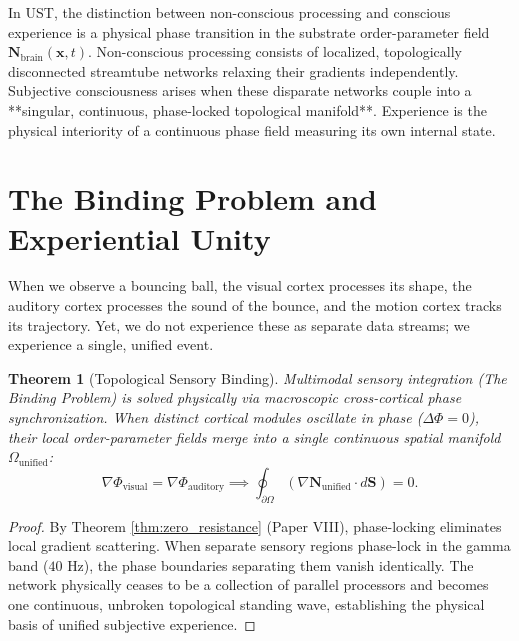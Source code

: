 \documentclass[11pt,a4paper]{article}
\newtheorem{thm}{Theorem}
\begin{document}
	In UST, the distinction between non-conscious processing and conscious experience is a physical phase transition in the substrate order-parameter field $\mathbf{N}_{\text{brain}}(\mathbf{x}, t)$. 
	Non-conscious processing consists of localized, topologically disconnected streamtube networks relaxing their gradients independently. Subjective consciousness arises when these disparate networks couple into a **singular, continuous, phase-locked topological manifold**. Experience is the physical interiority of a continuous phase field measuring its own internal state.
	
	\section{The Binding Problem and Experiential Unity}
	\label{sec:binding_problem}
	
	When we observe a bouncing ball, the visual cortex processes its shape, the auditory cortex processes the sound of the bounce, and the motion cortex tracks its trajectory. Yet, we do not experience these as separate data streams; we experience a single, unified event. 
	
	\begin{thm}[Topological Sensory Binding]
		\label{thm:sensory_binding}
		Multimodal sensory integration (The Binding Problem) is solved physically via macroscopic cross-cortical phase synchronization. When distinct cortical modules oscillate in phase ($\Delta \Phi = 0$), their local order-parameter fields merge into a single continuous spatial manifold $\Omega_{\text{unified}}$:
		\begin{equation}
			\nabla \Phi_{\text{visual}} = \nabla \Phi_{\text{auditory}} \implies \oint_{\partial \Omega} (\nabla \mathbf{N}_{\text{unified}} \cdot d\mathbf{S}) = 0.
			\label{eq:binding_phase_lock}
		\end{equation}
	\end{thm}
	
	\begin{proof}
		By Theorem \ref{thm:zero_resistance} (Paper VIII), phase-locking eliminates local gradient scattering. When separate sensory regions phase-lock in the gamma band ($40 \text{ Hz}$), the phase boundaries separating them vanish identically. The network physically ceases to be a collection of parallel processors and becomes one continuous, unbroken topological standing wave, establishing the physical basis of unified subjective experience.
	\end{proof}
	
\end{document}
